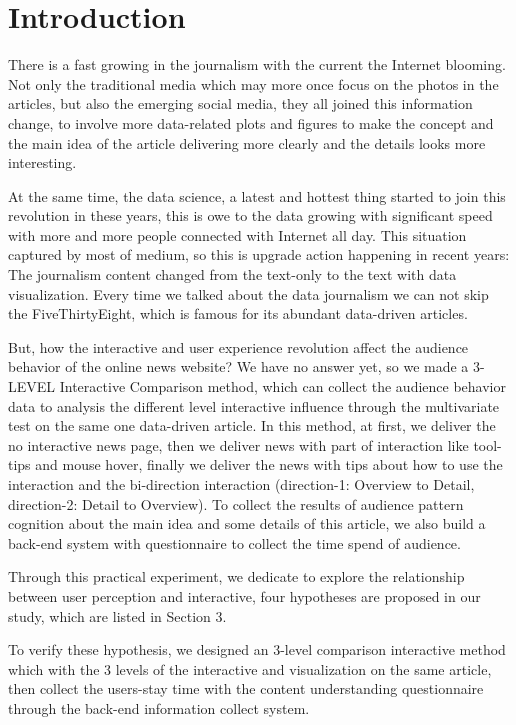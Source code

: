 \documentclass[9pt,journal,compsoc]{IEEEtran}
\begin{document}
\section{Introduction}
\large
There is a fast growing in the journalism with the current the Internet blooming. Not only the traditional media which may more once focus on the photos in the articles, but also the emerging social media, they all joined this information change, to involve more data-related plots and figures to make the concept and the main idea of the article delivering more clearly and the details looks more interesting.

At the same time, the data science, a latest and hottest thing started to join this revolution in these years, this is owe to the data growing with significant speed with more and more people connected with Internet all day. This situation captured by most of medium, so this is upgrade action happening in recent years: The journalism content changed from the text-only to the text with data visualization. Every time we talked about the data journalism we can not skip the FiveThirtyEight, which is famous for its abundant data-driven articles.

But, how the interactive and user experience revolution affect the audience behavior of the online news website? We have no answer yet, so we made a 3-LEVEL Interactive Comparison method, which can collect the audience behavior data to analysis the different level interactive influence through the multivariate test on the same one data-driven article. In this method, at first, we deliver the no interactive news page, then we deliver news with part of interaction like tool-tips and mouse hover, finally we deliver the news with tips about how to use the interaction and the bi-direction interaction (direction-1: Overview to Detail, direction-2: Detail to Overview). To collect the results of audience pattern cognition about the main idea and some details of this article, we also build a back-end system with questionnaire to collect the time spend of audience.

 Through this practical experiment, we dedicate to explore the relationship between user perception and interactive, four hypotheses are proposed in our study, which are listed in Section 3.

 To verify these hypothesis, we designed an 3-level comparison interactive method which with the 3 levels of the interactive and visualization on the same article, then collect the users-stay time with the content understanding questionnaire through the back-end information collect system. 
\end{document}
